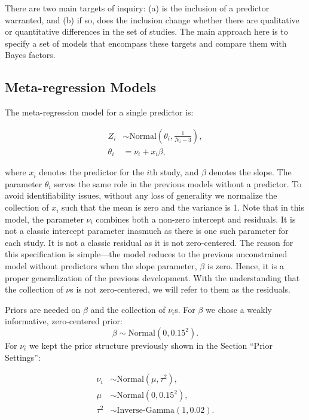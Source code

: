 \documentclass[english,,man]{apa6}
\begin{document}
There are two main targets of inquiry: (a) is the inclusion of a predictor warranted, and (b) if so, does the inclusion change whether there are qualitative or quantitative differences in the set of studies. The main approach here is to specify a set of models that encompass these targets and compare them with Bayes factors.

\hypertarget{meta-regression-models}{%
\subsection{Meta-regression Models}\label{meta-regression-models}}

The meta-regression model for a single predictor is:

\begin{align} \label{eq:pred}
Z_i &\sim \mbox{Normal}(\theta_i, \frac{1}{N_i - 3}),\\
\theta_i &= \nu_i + x_i \beta,
\end{align}

where \(x_i\) denotes the predictor for the \(i\)th study, and \(\beta\) denotes the slope. The parameter \(\theta_i\) serves the same role in the previous models without a predictor. To avoid identifiability issues, without any loss of generality we normalize the collection of \(x_i\) such that the mean is zero and the variance is 1. Note that in this model, the parameter \(\nu_i\) combines both a non-zero intercept and residuals. It is not a classic intercept parameter inasmuch as there is one such parameter for each study. It is not a classic residual as it is not zero-centered. The reason for this specification is simple---the model reduces to the previous unconstrained model without predictors when the slope parameter, \(\beta\) is zero. Hence, it is a proper generalization of the previous development. With the understanding that the collection of \(\nu\)s is not zero-centered, we will refer to them as the residuals.

Priors are needed on \(\beta\) and the collection of \(\nu_i\)s. For \(\beta\) we chose a weakly informative, zero-centered prior:
\[\beta \sim \mbox{Normal}(0, 0.15^2).\]
For \(\nu_i\) we kept the prior structure previously shown in the Section \enquote{Prior Settings}:

\begin{align*}
\nu_i &\sim \mbox{Normal}(\mu, \tau^2),\\
\mu &\sim \mbox{Normal}(0, 0.15^2),\\
\tau^2 &\sim \mbox{Inverse-Gamma}(1, 0.02).
\end{align*}
\end{document}
